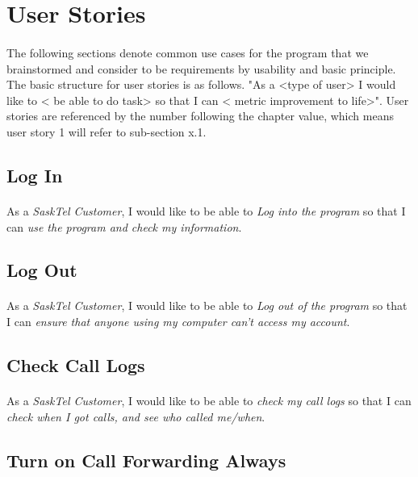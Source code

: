 \documentclass[12pt]{article}
\begin{document}
\newpage

\section{User Stories}
\paragraph{}	The following sections denote common use cases for the program that we brainstormed and consider to be requirements by usability and basic principle. The basic structure for user stories is as follows. "As a <type of user> I would like to < be able to do task> so that I can < metric improvement to life>". User stories are referenced by the number following the chapter value, which means user story 1 will refer to sub-section x.1.

\subsection{Log In}
\paragraph{}	As a \textit{SaskTel Customer}, I would like to be able to \textit{Log into the program} so that I can \textit{use the program and check my information}.

\subsection{Log Out}
\paragraph{}	As a \textit{SaskTel Customer}, I would like to be able to \textit{Log out of the program} so that I can \textit{ensure that anyone using my computer can't access my account}.

\subsection{Check Call Logs}
\paragraph{}	As a \textit{SaskTel Customer}, I would like to be able to \textit{check my call logs} so that I can \textit{check when I got calls, and see who called me/when}.

\subsection{Turn on Call Forwarding Always}
\end{document}
